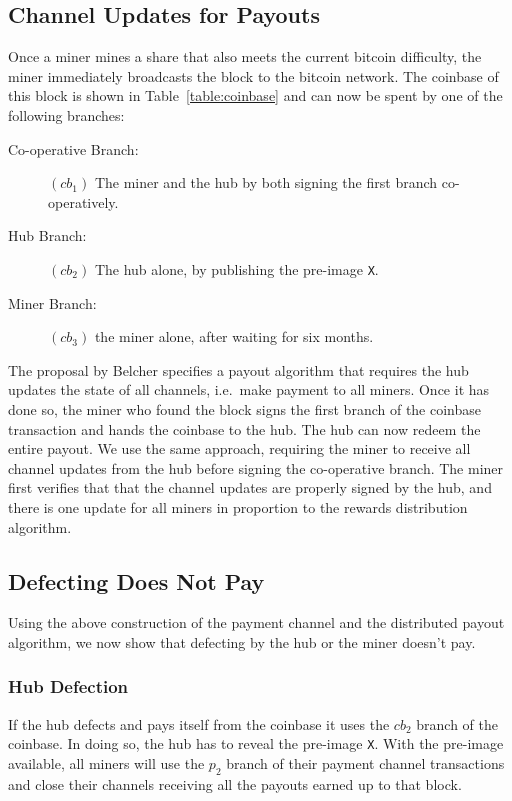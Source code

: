 \documentclass{article}
\begin{document}
\subsection{Channel Updates for Payouts}\label{sec:channel-update}

Once a miner mines a share that also meets the current bitcoin
difficulty, the miner immediately broadcasts the block to the bitcoin
network. The coinbase of this block is shown in
Table~\ref{table:coinbase} and can now be spent by one of the following
branches:

\begin{description}
\item[Co-operative Branch:] $(cb_1)$ The miner and the hub by both signing the
  first branch co-operatively.
\item[Hub Branch:] $(cb_2)$ The hub alone, by publishing the pre-image \verb|X|.
\item[Miner Branch:] $(cb_3)$ the miner alone, after waiting for six months.
\end{description}

The proposal by Belcher specifies a payout algorithm that requires the
hub updates the state of all channels, i.e.\ make payment to all
miners. Once it has done so, the miner who found the block signs the
first branch of the coinbase transaction and hands the coinbase to the
hub. The hub can now redeem the entire payout. We use the same
approach, requiring the miner to receive all channel updates from the
hub before signing the co-operative branch. The miner first verifies
that that the channel updates are properly signed by the hub, and
there is one update for all miners in proportion to the rewards
distribution algorithm.

\subsection{Defecting Does Not Pay}\label{ref:defecting}

Using the above construction of the payment channel and the
distributed payout algorithm, we now show that defecting by the hub or
the miner doesn't pay.

\subsubsection{Hub Defection}\label{ref:hub-defects}

If the hub defects and pays itself from the coinbase it uses the
$cb_2$ branch of the coinbase. In doing so, the hub has to reveal the
pre-image \verb|X|. With the pre-image available, all miners will use
the $p_2$ branch of their payment channel transactions and close their
channels receiving all the payouts earned up to that block.
\end{document}

